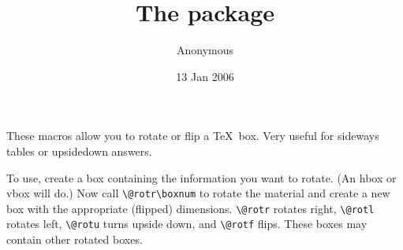 \documentclass[pagesize=auto, fontsize=14pt, DIV=9, parskip=half]{scrartcl}
\title{The \pkg{rotate} package}
\author{Anonymous}
\date{13 Jan 2006}
\begin{document}
\maketitle

These macros allow you to rotate or flip a \TeX\ box.  Very useful for
sideways tables or upsidedown answers.

To use, create a box containing the information you want to rotate.
(An hbox or vbox will do.)  Now call \verb|\@rotr\boxnum| to rotate the
material and create a new box with the appropriate (flipped) dimensions.
\verb|\@rotr| rotates right, \verb|\@rotl| rotates left, \verb|\@rotu| turns upside down, and
\verb|\@rotf| flips.  These boxes may contain other rotated boxes.
\end{document}
